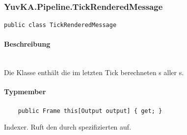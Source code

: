 \subsubsection{YuvKA.Pipeline.TickRenderedMessage}
		
\begin{verbatim}
public class TickRenderedMessage
\end{verbatim}

\paragraph{Beschreibung}~\\
Die Klasse  enthält die im letzten Tick berechneten s aller s.

\paragraph{Typmember}
\begin{itemize}
	
	\begin{verbatim}
	public Frame this[Output output] { get; }
	\end{verbatim}
Indexer. Ruft den durch  spezifizierten  auf.

\end{itemize}
